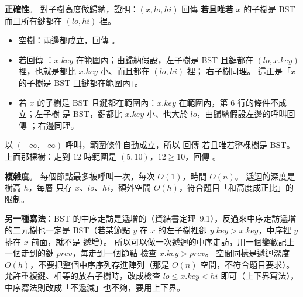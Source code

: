 \begin{pastsoln}
\textbf{正確性}。 對子樹高度做歸納，證明：$(x, \mathit{lo}, \mathit{hi})$ 回傳 \TRUE
\textbf{若且唯若} $x$ 的子樹是 BST 而且所有鍵都在 $(\mathit{lo}, \mathit{hi})$ 裡。
\begin{itemize}
\item 空樹：兩邊都成立，回傳 \TRUE。
\item 若回傳 \TRUE：$x.\mathit{key}$ 在範圍內；由歸納假設，左子樹是 BST 且鍵都在
$(\mathit{lo}, x.\mathit{key})$ 裡，也就是都比 $x.\mathit{key}$ 小、而且都在 $(\mathit{lo}, \mathit{hi})$ 裡；
右子樹同理。 這正是「$x$ 的子樹是 BST 且鍵都在範圍內」。
\item 若 $x$ 的子樹是 BST 且鍵都在範圍內：$x.\mathit{key}$ 在範圍內，第 6 行的條件不成立；左子樹
是 BST，鍵都比 $x.\mathit{key}$ 小、也大於 $\mathit{lo}$，由歸納假設左邊的呼叫回傳 \TRUE；右邊同理。
\end{itemize}
以 $(-\infty, +\infty)$ 呼叫，範圍條件自動成立，所以  回傳 \TRUE 若且唯若整棵樹是 BST。
上面那棵樹：走到 $12$ 時範圍是 $(5, 10)$，$12 \ge 10$，回傳 \FALSE。

\textbf{複雜度}。 每個節點最多被呼叫一次，每次 $O(1)$，時間 $O(n)$。 遞迴的深度是樹高 $h$，每層
只存 $x$、$\mathit{lo}$、$\mathit{hi}$，額外空間 $O(h)$，符合題目「和高度成正比」的限制。

\textbf{另一種寫法}：BST 的中序走訪是遞增的（資結書定理~9.1），反過來中序走訪遞增的二元樹也一定是
BST（若某節點 $y$ 在 $x$ 的左子樹裡卻 $y.\mathit{key} > x.\mathit{key}$，中序裡 $y$ 排在 $x$ 前面，就不是
遞增）。 所以可以做一次遞迴的中序走訪，用一個變數記上一個走到的鍵 $\mathit{prev}$，每走到一個節點
檢查 $x.\mathit{key} > \mathit{prev}$。 空間同樣是遞迴深度 $O(h)$，不要把整個中序序列存進陣列（那是
$O(n)$ 空間，不符合題目要求）。 允許重複鍵、相等的放右子樹時，改成檢查
$\mathit{lo} \le x.\mathit{key} < \mathit{hi}$ 即可（上下界寫法），中序寫法則改成「不遞減」也不夠，要用上下界。
\end{pastsoln}
